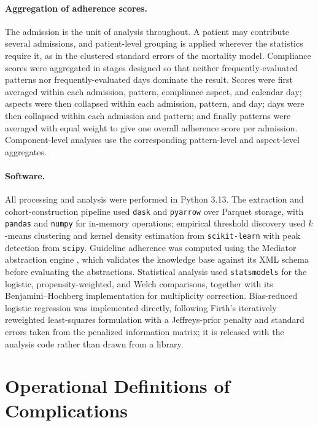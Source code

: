 \documentclass[11pt,a4paper]{article}
\begin{document}
\paragraph{Aggregation of adherence scores.}
The admission is the unit of analysis throughout. A patient may contribute
several admissions, and patient-level grouping is applied wherever the
statistics require it, as in the clustered standard errors of the mortality
model. Compliance scores were aggregated in stages designed so that neither
frequently-evaluated patterns nor frequently-evaluated days dominate the
result. Scores were first averaged within each admission, pattern, compliance
aspect, and calendar day; aspects were then collapsed within each admission,
pattern, and day; days were then collapsed within each admission and pattern;
and finally patterns were averaged with equal weight to give one overall
adherence score per admission. Component-level analyses use the corresponding
pattern-level and aspect-level aggregates.

\paragraph{Software.}
All processing and analysis were performed in Python 3.13. The extraction and
cohort-construction pipeline used \texttt{dask} and \texttt{pyarrow} over
Parquet storage, with \texttt{pandas} and \texttt{numpy} for in-memory
operations; empirical threshold discovery used $k$-means clustering and
kernel density estimation from \texttt{scikit-learn} with peak detection from
\texttt{scipy}. Guideline adherence was computed using the Mediator
abstraction engine \citep{mediator-github}, which validates the knowledge
base against its XML schema before evaluating the abstractions. Statistical
analysis used \texttt{statsmodels} for the logistic, propensity-weighted, and
Welch comparisons, together with its Benjamini--Hochberg implementation for
multiplicity correction. Bias-reduced logistic regression was implemented
directly, following Firth's iteratively reweighted least-squares formulation
with a Jeffreys-prior penalty and standard errors taken from the penalized
information matrix; it is released with the analysis code rather than drawn
from a library.

\section{Operational Definitions of Complications}
\label{app:definitions}
\end{document}
